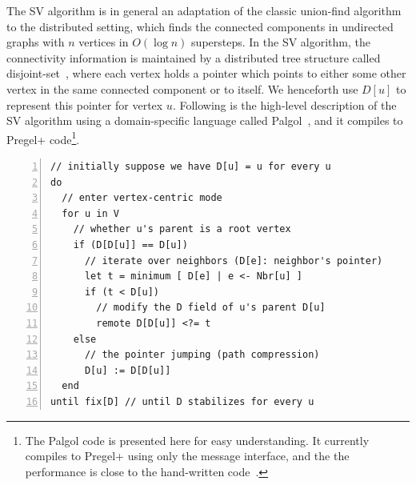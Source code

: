 \documentclass{sokendai_thesis} %
\begin{document}
The SV algorithm is in general an adaptation of the classic union-find algorithm~\cite{disjointset} to the distributed setting, which finds the connected components in undirected graphs with $n$ vertices in $O(\log n)$ supersteps.
In the SV algorithm, the connectivity information is maintained by a distributed tree structure called disjoint-set~\cite{disjointset}, where each vertex holds a pointer which points to either some other vertex in the same connected component or to itself.
We henceforth use $D[u]$ to represent this pointer for vertex $u$.
Following is the high-level description of the SV algorithm using a domain-specific language called Palgol~\cite{palgol}, and it compiles to Pregel+ code\footnote{The Palgol code is presented here for easy understanding. It currently compiles to Pregel+ using only the message interface, and the the performance is close to the hand-written code~\cite{palgol}.}.

\begin{lstlisting}[basicstyle=\scriptsize\ttfamily,language=palgol,
numbers=left,stepnumber=1,xleftmargin=2.5em,commentstyle=\color{xgreen},numberfirstline=false]
// initially suppose we have D[u] = u for every u
do
  // enter vertex-centric mode
  for u in V
    // whether u's parent is a root vertex
    if (D[D[u]] == D[u])
      // iterate over neighbors (D[e]: neighbor's pointer)
      let t = minimum [ D[e] | e <- Nbr[u] ]
      if (t < D[u])
        // modify the D field of u's parent D[u]
        remote D[D[u]] <?= t
    else
      // the pointer jumping (path compression)
      D[u] := D[D[u]]
  end
until fix[D] // until D stabilizes for every u
\end{lstlisting}
\end{document}
